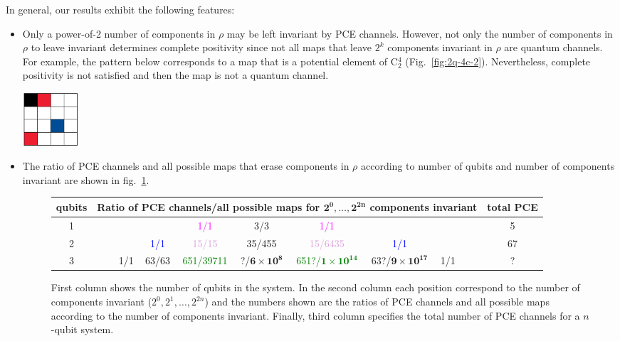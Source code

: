 \documentclass[11pt,dvipsnames]{article} %
\newcommand{\fref}[1]{fig.~\ref{#1}}  \newcommand{\tref}[1]{table~\ref{#1}}
\newcommand{\Fref}[1]{Fig.~\ref{#1}}  \newcommand{\Tref}[1]{Table~\ref{#1}}
\newcommand{\1}{\mathds{1}}
\begin{document}
In general, our results exhibit the following features:
\begin{itemize}
\item Only a power-of-2 number of components in $\rho$ 
may be left invariant by PCE 
channels. However, not only the number of components in $\rho$ 
to leave invariant determines complete positivity since
not all maps that leave $2^{k}$ components invariant in $\rho$
are quantum channels. For example, the pattern below corresponds 
to a map that is a potential element of C${}_2^4$ (\Fref{fig:2q-4c-2}).
Nevertheless, complete positivity is not satisfied 
and then the map is not a quantum channel. 
\begin{center}
	\includegraphics[height=2cm]{img/not-cc}
\end{center}

\item 
The ratio of PCE channels and all possible maps
that erase components in $\rho$ according to number of qubits 
and number of components
invariant are shown in \fref{fig:CCs-by-components}.



\begin{figure}[H]%
\centering	
\footnotesize
\bf{
\begin{tabular}{c|ccccccccccc|c}
qubits  & \multicolumn{11}{c|}{Ratio of PCE channels/all possible maps for 
$\mathbf{2^0,\ldots,2^{2n}}$ components invariant} & total PCE \\
\hline
1 &&&&&\textcolor{Magenta}{1/1}&3/3&\textcolor{Magenta}{1/1}&&&&&5\\
2 &&&&\textcolor{Blue}{1/1}&\textcolor{Plum}{15/15}&35/455&
\textcolor{Plum}{15/6435}&\textcolor{Blue}{1/1}&&&&67\\
3 &&&\textcolor{BrickRed}{1/1}&\textcolor{YellowOrange}{63/63}&
\textcolor{Green}{651/39711}&
?/$\mathbf{6\times 10^8}$&
\textcolor{Green}{651?/$\mathbf{1\times 10^{14}}$}&
\textcolor{YellowOrange}{63?/$\mathbf{9\times 10^{17}}$}&
\textcolor{BrickRed}{1/1}&&&?
\end{tabular}
}
\caption{First column shows the number of qubits in the system.  In the second
column each position correspond to the number of components invariant ($2^0,
2^1, \ldots, 2^{2n}$) and the numbers shown are the ratios of PCE channels
and all possible maps according to the number of components invariant.  Finally, third column
specifies the total number of PCE channels for a $n$-qubit system.}
\label{fig:CCs-by-components}
\end{figure} %


\end{itemize}
\end{document}

